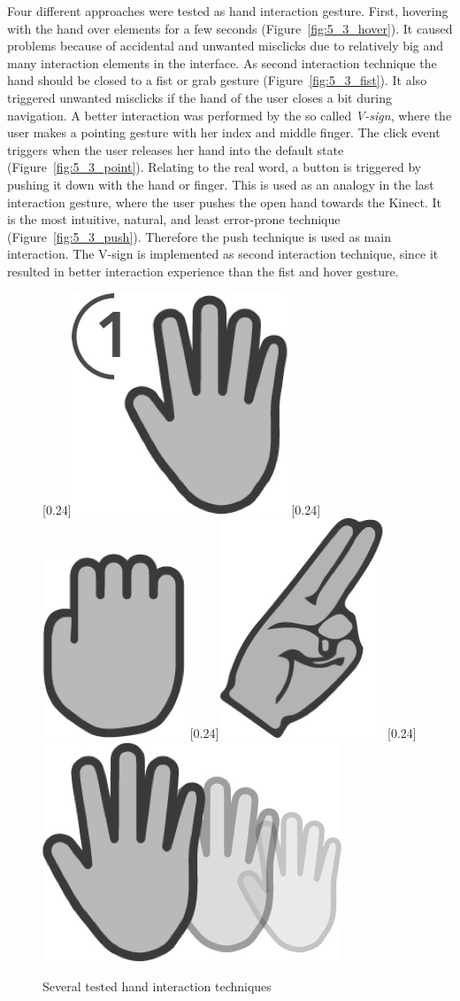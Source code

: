 Four different approaches were tested as hand interaction gesture.
First, hovering with the hand over elements for a few seconds (Figure~\ref{fig:5_3_hover}).
It caused problems because of accidental and unwanted misclicks due to relatively big and many interaction elements in the interface.
As second interaction technique the hand should be closed to a fist or grab gesture (Figure~\ref{fig:5_3_fist}).
It also triggered unwanted misclicks if the hand of the user closes a bit during navigation.
A better interaction was performed by the so called \textit{V-sign}, where the user makes a pointing gesture with her index and middle finger.
The click event triggers when the user releases her hand into the default state (Figure~\ref{fig:5_3_point}).
Relating to the real word, a button is triggered by pushing it down with the hand or finger.
This is used as an analogy in the last interaction gesture, where the user pushes the open hand towards the Kinect.
It is the most intuitive, natural, and least error-prone technique (Figure~\ref{fig:5_3_push}). %
Therefore the push technique is used as main interaction. The V-sign is implemented as second interaction technique, since it resulted in better interaction experience than the fist and hover gesture.
\begin{figure}[htb]
	\centering
		[0.24\linewidth]{\includegraphics[width=0.12\linewidth]{Pictures/5_3_hover}}
		[0.24\linewidth]{\includegraphics[width=0.08\linewidth]{Pictures/5_3_fist}}
		[0.24\linewidth]{\includegraphics[width=0.097\linewidth]{Pictures/5_3_point}}
		[0.24\linewidth]{\includegraphics[width=0.176\linewidth]{Pictures/5_3_push2}}
	\caption{Several tested hand interaction techniques}%
	\label{fig:5_3_handInteraction}
\end{figure}

